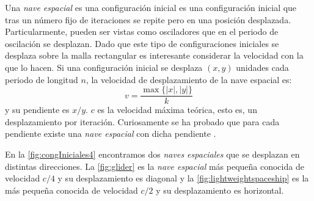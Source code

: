 \documentclass[../proyecto.tex]{memoir}
\begin{document}

Una \textit{nave espacial} es una configuración inicial es una configuración inicial que tras un número fijo de iteraciones se repite pero en una posición desplazada. Particularmente, pueden ser vistas como osciladores que en el periodo de oscilación se desplazan. Dado que este tipo de configuraciones iniciales se desplaza sobre la malla rectangular es interesante considerar la velocidad con la que lo hacen. Si una configuración inicial se desplaza $(x, y)$ unidades cada periodo de longitud $n$, la velocidad de desplazamiento de la nave espacial es: $$
 v = \frac{\max\{|x|,|y|\}}{k}
$$ 
y su pendiente es $x/y$.  $c$ es la velocidad máxima teórica, esto es, un desplazamiento por iteración. Curiosamente se ha probado que para cada pendiente existe una \textit{nave espacial} con dicha pendiente \cite{pendienteNaves}.

En la \autoref{fig:congIniciales4} encontramos dos \textit{naves espaciales} que se desplazan en distintas direcciones. La \autoref{fig:glider} es la \textit{nave espacial} más pequeña conocida de velocidad $c/4$ y su desplazamiento es diagonal y la \autoref{fig:lightweightspaceship} es la más pequeña conocida de velocidad $c/2$ y su desplazamiento es horizontal.
\end{document}

